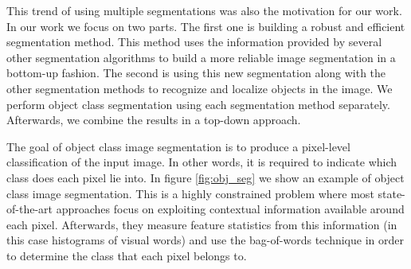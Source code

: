 \documentclass[10pt,twocolumn,letterpaper]{article}
\begin{document}
This trend of using multiple segmentations was also the motivation for our work.
In our work we focus on two parts. The first one is building a robust and
efficient segmentation method. This method uses the information provided by
several other segmentation algorithms to build a more reliable image segmentation
in a bottom-up fashion. The second is using this new segmentation along with the
other segmentation methods to recognize and localize objects in the image. We
perform object class segmentation using each segmentation method separately.
Afterwards, we combine the results in a top-down approach.

The goal of object class image segmentation is to produce a pixel-level
classification of the input image. In other words, it is required to indicate
which class does each pixel lie into. In figure \ref{fig:obj_seg} we show
an example of object class image segmentation. This is a highly constrained
problem where most state-of-the-art approaches focus on exploiting contextual
information available around each pixel. Afterwards, they measure feature
statistics from this information (in this case histograms of visual words)
and use the bag-of-words technique in order to determine the class that
each pixel belongs to.
\end{document}
